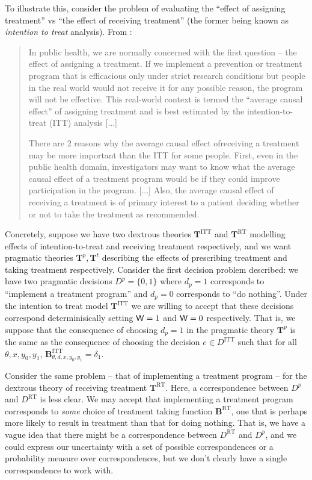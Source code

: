 To illustrate this, consider the problem of evaluating the ``effect of assigning treatment'' vs ``the effect of receiving treatment'' (the former being known as \emph{intention to treat} analysis). From \citet{shrier_intention--treat_2017}:

\begin{quote}
In public health, we are normally concerned with the first question -- the effect of assigning a treatment. If we implement a prevention or treatment program that is efficacious only under strict research conditions but people in the real world would not receive it for any possible reason, the program will not be effective. This real-world context is termed the “average causal effect” of assigning treatment and is best estimated by the intention-to-treat (ITT) analysis [...]

There are 2 reasons why the average causal effect ofreceiving a treatment may be more important than the ITT for some people. First, even in the public health domain, investigators may want to know what the average causal effect of a treatment program would be if they could improve participation in the program. [...] Also, the average causal effect of receiving a treatment is of primary interest to a patient deciding whether or not to take the treatment as recommended.
\end{quote}

Concretely, suppose we have two dextrous theories $\mathbf{T}^{\mathrm{ITT}}$ and $\mathbf{T}^{\mathrm{RT}}$ modelling effects of intention-to-treat and receiving treatment respectively, and we want pragmatic theories $\mathbf{T}^p,\mathbf{T}^t$ describing the effects of prescribing treatment and taking treatment respectively. Consider the first decision problem described: we have two pragmatic decisions $D^p=\{0,1\}$ where $d_p=1$ corresponds to ``implement a treatment program'' and $d_p=0$ corresponds to ``do nothing''. Under the intention to treat model $\mathbf{T}^{\mathrm{ITT}}$ we are willing to accept that these decisions correspond determinisically setting $\mathsf{W}=1$ and $\mathsf{W}=0$ respectively. That is, we suppose that the consequence of choosing $d_p=1$ in the pragmatic theory $\mathbf{T}^p$ is the same as the consequence of choosing the decision $e\in D^{\mathrm{ITT}}$ such that for all $\theta,x,y_0,y_1$, $\mathbf{B}^{\mathrm{ITT}}_{\theta,d,x,y_0,y_1} = \delta_1$. 

Consider the same problem -- that of implementing a treatment program -- for the dextrous theory of receiving treatment $\mathbf{T}^{\mathrm{RT}}$. Here, a correspondence between $D^p$ and $D^{\mathrm{RT}}$ is less clear. We may accept that implementing a treatment program corresponds to \emph{some} choice of treatment taking function $\mathbf{B}^{\mathrm{RT}}$, one that is perhaps more likely to result in treatment than that for doing nothing. That is, we have a vague idea that there might be a correspondence between $D^{\mathrm{RT}}$ and $D^p$, and we could express our uncertainty with a set of possible correspondences or a probability measure over correspondences, but we don't clearly have a single correspondence to work with.

